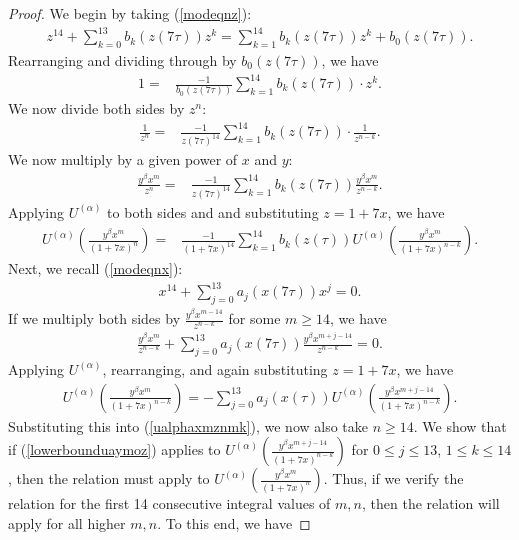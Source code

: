 \documentclass[10pt,a4paper]{amsart}
\begin{document}
\begin{proof}

We begin by taking (\ref{modeqnz}):
\begin{align*}
z^{14}+\sum_{k=0}^{13}b_k(z(7\tau))z^k= \sum_{k=1}^{14}b_k(z(7\tau))z^k + b_0(z(7\tau)).
\end{align*}  Rearranging and dividing through by $b_0(z(7\tau))$, we have
\begin{align*}
1 =& \frac{-1}{b_0(z(7\tau))}\sum_{k=1}^{14}b_k(z(7\tau))\cdot z^{k}.
\end{align*}  We now divide both sides by $z^n$:
\begin{align*}
\frac{1}{z^{n}} =& \frac{-1}{z(7\tau)^{14}}\sum_{k=1}^{14}b_k(z(7\tau))\cdot \frac{1}{z^{n-k}}.
\end{align*}  We now multiply by a given power of $x$ and $y$:
\begin{align*}
\frac{y^{\beta}x^m}{z^{n}} =& \frac{-1}{z(7\tau)^{14}}\sum_{k=1}^{14}b_k(z(7\tau))\frac{y^{\beta}x^m}{z^{n-k}}.
\end{align*}  Applying $U^{(\alpha)}$ to both sides and and substituting $z=1+7x$, we have
\begin{align}
U^{(\alpha)}\left(\frac{y^{\beta}x^m}{(1+7x)^{n}}\right) =& \frac{-1}{(1+7x)^{14}}\sum_{k=1}^{14}b_k(z(\tau)) U^{(\alpha)}\left(\frac{y^{\beta}x^m}{(1+7x)^{n-k}}\right).\label{ualphaxmznmk}
\end{align}  Next, we recall (\ref{modeqnx}):
\begin{align*}
x^{14}+\sum_{j=0}^{13}a_j(x(7\tau))x^j=0.
\end{align*} 
If we multiply both sides by $\frac{y^{\beta}x^{m-14}}{z^{n-k}}$ for some $m\ge 14$, we have
\begin{align*}
\frac{y^{\beta}x^{m}}{z^{n-k}}+\sum_{j=0}^{13}a_j(x(7\tau))\frac{y^{\beta}x^{m+j-14}}{z^{n-k}}=0.
\end{align*}  Applying $U^{(\alpha)}$, rearranging, and again substituting $z=1+7x$, we have
\begin{align*}
U^{(\alpha)}\left(\frac{y^{\beta}x^{m}}{(1+7x)^{n-k}}\right) = -\sum_{j=0}^{13}a_j(x(\tau)) U^{(\alpha)}\left(\frac{y^{\beta}x^{m+j-14}}{(1+7x)^{n-k}}\right).
\end{align*}  Substituting this into (\ref{ualphaxmznmk}), we now also take $n\ge 14$.  We show that if (\ref{lowerbounduaymoz}) applies to $U^{(\alpha)}\left( \frac{y^{\beta}x^{m+j-14}}{(1+7x)^{n-k}} \right)$ for $0\le j\le 13$, $1\le k\le 14$, then the relation must apply to $U^{(\alpha)}\left( \frac{y^{\beta}x^{m}}{(1+7x)^{n}} \right)$.  Thus, if we verify the relation for the first 14 consecutive integral values of $m,n$, then the relation will apply for all higher $m,n$.  To this end, we have

\end{proof}
\end{document}
